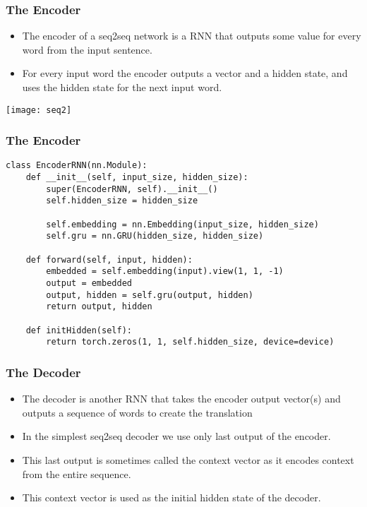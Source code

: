 \begin{frame}[fragile]
\frametitle{The Encoder}

\begin{itemize}
\item The encoder of a seq2seq network is a RNN that outputs some value for every word from the input sentence.
\item For every input word the encoder outputs a vector and a hidden state, and uses the hidden state for the next input word.
\end{itemize}
\begin{center}
\texttt{[image: seq2]}
\end{center}           
\end{frame} 

\begin{frame}[fragile]
\frametitle{The Encoder}
\begin{lstlisting}    
class EncoderRNN(nn.Module):
    def __init__(self, input_size, hidden_size):
        super(EncoderRNN, self).__init__()
        self.hidden_size = hidden_size

        self.embedding = nn.Embedding(input_size, hidden_size)
        self.gru = nn.GRU(hidden_size, hidden_size)

    def forward(self, input, hidden):
        embedded = self.embedding(input).view(1, 1, -1)
        output = embedded
        output, hidden = self.gru(output, hidden)
        return output, hidden

    def initHidden(self):
        return torch.zeros(1, 1, self.hidden_size, device=device)
\end{lstlisting} 
      
\end{frame} 

\begin{frame}[fragile]
\frametitle{The Decoder}

\begin{itemize}
\item The decoder is another RNN that takes the encoder output vector(s) and outputs a sequence of words to create the translation
\item In the simplest seq2seq decoder we use only last output of the encoder. 
\item This last output is sometimes called the context vector as it encodes context from the entire sequence. 
\item This context vector is used as the initial hidden state of the decoder.
\end{itemize}
        
\end{frame} 


